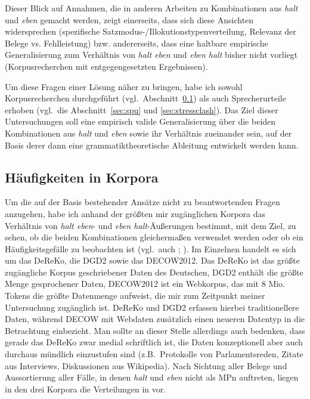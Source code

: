 Dieser Blick auf Annahmen, die in anderen Arbeiten zu Kombinationen aus \textit{halt} und \textit{eben} gemacht werden, zeigt einerseits, dass sich diese Ansichten widersprechen (spezifische Satzmodus-/Illokutionstypenverteilung, Relevanz der Be\-lege vs. Fehlleistung) bzw. andererseits, dass eine haltbare empirische Generalisierung zum Verhältnis von \textit{halt eben} und \textit{eben halt} bisher nicht vorliegt (Korpusrecher\-chen mit entgegengesetzten Ergebnissen). 

Um diese Fragen einer Lösung näher zu bringen, habe ich sowohl Korpusrecherchen durchgeführt (vgl.\ Abschnitt~\ref{sec:häufko}) als auch Sprecherurteile erhoben (vgl.\ die Abschnitt~\ref{sec:spu} und \ref{sec:stressclash}). Das Ziel dieser Untersuchungen soll eine empirisch valide Generalisierung über die beiden Kombinationen aus \textit{halt} und \textit{eben} sowie ihr Verhältnis zueinander sein, auf der Basis derer dann eine grammatiktheoretische Ableitung entwickelt werden kann.

\subsection{Häufigkeiten in Korpora}
\label{sec:häufko}
Um die auf der Basis bestehender Ansätze nicht zu beantwortenden Fragen anzugehen, habe ich anhand der größten mir zugänglichen Korpora das Verhältnis von \textit{halt eben}- und \textit{eben halt}-Äußerungen bestimmt, mit dem Ziel, zu sehen, ob die beiden Kombinationen gleichermaßen verwendet werden oder ob ein Häufigkeitsgefälle zu beobachten ist (vgl.\ auch \citealt[148--155]{Mueller2016b}; \citeyear[233--235]{Mueller2017a}). Im Einzelnen handelt es sich um das DeReKo, die DGD2 sowie das DECOW2012. Das DeReKo ist das größte zugängliche Korpus geschriebener Daten des Deutschen, DGD2 enthält die größte Menge gesprochener Daten, DECOW2012 ist ein Web\-korpus, das mit 8 Mio. Tokens die größte Datenmenge aufweist, die mir zum Zeitpunkt meiner Untersuchung zugänglich ist. DeReKo und DGD2 erfassen hier\-bei traditionellere Daten, während DECOW mit Webdaten zusätzlich einen neueren Datentyp in die Betrachtung einbezieht. Man sollte an dieser Stelle allerdings auch bedenken, dass gerade das DeReKo zwar medial schriftlich ist, die Daten konzeptionell aber auch durchaus mündlich einzustufen sind (z.B.\ Protokolle von Parlamentsreden, Zitate aus Interviews, Diskussionen aus Wikipedia). Nach Sichtung aller Belege und Aussortierung aller Fälle, in denen \textit{halt} und \textit{eben} nicht als MPn auftreten, liegen in den drei Korpora die Verteilungen in  vor.

